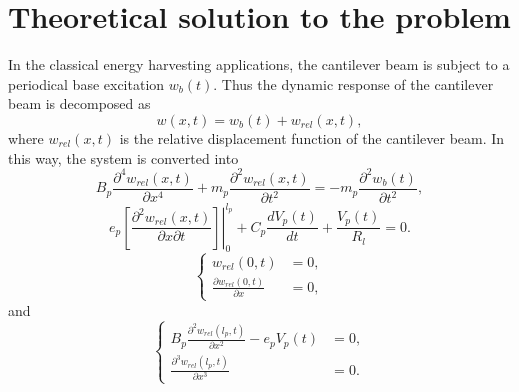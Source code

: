 \documentclass{article}
\begin{document}
\section{Theoretical solution to the problem}

In the classical energy harvesting applications, the cantilever beam is subject to a periodical base excitation $w_b(t)$. Thus the dynamic response of the cantilever beam is decomposed as 
\begin{equation}
    w(x,t) = w_b(t) + w_{rel}(x,t),
\end{equation}
where $w_{rel}(x,t)$ is the relative displacement function of the cantilever beam. In this way, the system is converted into 
\begin{equation}
    B_p \frac{\partial^4 w_{rel}(x,t)}{\partial x^4} + m_p \frac{\partial^2 w_{rel}(x,t)}{\partial t^2} = - m_p \frac{\partial^2 w_{b}(t)}{\partial t^2},
\end{equation}
\begin{equation}
    e_p \left.\left[ \frac{\partial^2 w_{rel}(x,t)}{\partial x \partial t}\right]\right|_0^{l_p} + C_p \frac{d V_p(t)}{d t} + \frac{V_p(t)}{R_l} = 0.
\end{equation}
\begin{equation}
    \left\{\begin{aligned}
        w_{rel}(0,t) &= 0, \\
        \frac{\partial w_{rel}(0,t)}{\partial x} &= 0,
    \end{aligned}\right.
\end{equation}
and
\begin{equation}
    \left\{\begin{aligned}
        B_p \frac{\partial^2 w_{rel}(l_p,t)}{\partial x^2} - e_p V_p(t) &= 0, \\
        \frac{\partial^3 w_{rel}(l_p,t)}{\partial x^3} &= 0.
    \end{aligned}\right.
\end{equation}
\end{document}
